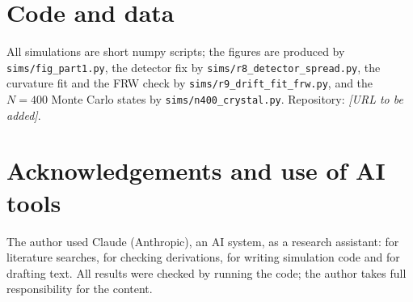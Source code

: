 \documentclass[11pt,a4paper]{article}
\begin{document}
\section*{Code and data}
All simulations are short numpy scripts; the figures are produced by \texttt{sims/fig\_part1.py}, the detector fix by \texttt{sims/r8\_detector\_spread.py}, the curvature fit and the FRW check by \texttt{sims/r9\_drift\_fit\_frw.py}, and the $N=400$ Monte Carlo states by \texttt{sims/n400\_crystal.py}. Repository: \textit{[URL to be added]}.

\section*{Acknowledgements and use of AI tools}
The author used Claude (Anthropic), an AI system, as a research assistant: for literature searches, for checking derivations, for writing simulation code and for drafting text. All results were checked by running the code; the author takes full responsibility for the content.
\end{document}
